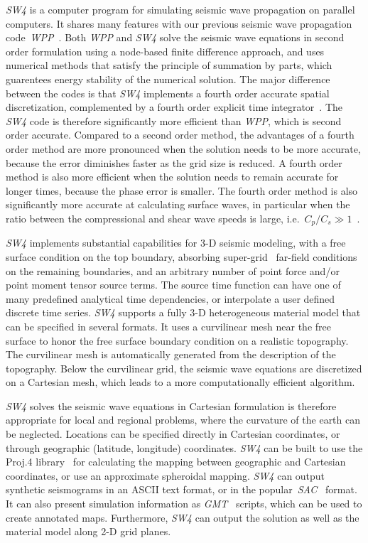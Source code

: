 \documentclass[11pt]{report}
\begin{document}
\emph{SW4} is a computer program for simulating seismic wave propagation on parallel computers. It
shares many features with our previous seismic wave propagation code~\emph{WPP}~\cite{WPP2}. Both
\emph{WPP} and \emph{SW4} solve the seismic wave equations in second order formulation using a
node-based finite difference approach, and uses numerical methods that satisfy the principle of
summation by parts, which guarentees energy stability of the numerical solution. The major
difference between the codes is that \emph{SW4} implements a fourth order accurate spatial
discretization, complemented by a fourth order explicit time integrator~\cite{SjoPet-12}. The
\emph{SW4} code is therefore significantly more efficient than \emph{WPP}, which is second order
accurate. Compared to a second order method, the advantages of a fourth order method are more
pronounced when the solution needs to be more accurate, because the error diminishes faster as the
grid size is reduced. A fourth order method is also more efficient when the solution needs to remain
accurate for longer times, because the phase error is smaller. The fourth order method is also
significantly more accurate at calculating surface waves, in particular when the ratio between the
compressional and shear wave speeds is large, i.e.~$C_p/C_s\gg 1$~\cite{KrePet-12}.

\emph{SW4} implements substantial capabilities for 3-D seismic modeling, with a free surface
condition on the top boundary, absorbing super-grid~\cite{PetSjo-13} far-field conditions on the
remaining boundaries, and an arbitrary number of point force and/or point moment tensor source
terms. The source time function can have one of many predefined analytical time dependencies, or
interpolate a user defined discrete time series. \emph{SW4} supports a fully 3-D heterogeneous
material model that can be specified in several formats. It uses a curvilinear mesh near the free
surface to honor the free surface boundary condition on a realistic topography. The curvilinear mesh
is automatically generated from the description of the topography. Below the curvilinear grid, the
seismic wave equations are discretized on a Cartesian mesh, which leads to a more computationally
efficient algorithm. 

\emph{SW4} solves the seismic wave equations in Cartesian formulation is therefore appropriate for
local and regional problems, where the curvature of the earth can be neglected. Locations can
be specified directly in Cartesian coordinates, or through geographic (latitude, longitude)
coordinates. \emph{SW4} can be built to use the Proj.4 library~\cite{Proj4} for calculating the
mapping between geographic and Cartesian coordinates, or use an approximate spheroidal
mapping. \emph{SW4} can output synthetic seismograms in an ASCII text format, or in the
popular~\emph{SAC}~\cite{Goldstein-et-al} format. It can also present simulation information as
\emph{GMT}~\cite{WesselSmithGMT} scripts, which can be used to create annotated maps. Furthermore,
\emph{SW4} can output the solution as well as the material model along 2-D grid planes.
\end{document}
